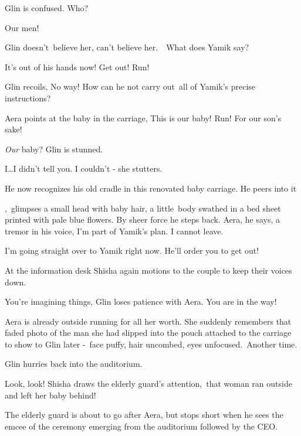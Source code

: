 \documentclass[twoside,11pt]{book}
\begin{document}
Glin is confused. {\textquotedbl}Who?{\textquotedbl}\ \ ~

{\textquotedbl}Our men!{\textquotedbl} 

Glin doesn't\ believe her, can't believe her.\ \ {\textquotedbl}What does Yamik say?{\textquotedbl} 

{\textquotedbl}It's out of his hands now! Get out! Run! {\textquotedbl} 

Glin recoils, {\textquotedbl}No way!{\textquotedbl} How can he not carry out~all of Yamik's precise instructions? 

Aera points at the baby in the carriage, {\textquotedbl}This is our baby! Run! For our son's sake!{\textquotedbl}~ 

{\textquotedbl}\textit{Our }baby?{\textquotedbl} Glin is stunned.

{\textquotedbl}I{\dots}I didn't tell you. I couldn't - {\textquotedbl}she stutters.

He now recognizes his old cradle in this renovated baby carriage. He peers into it

,{\ }glimpses a  small head with baby hair, a little{\ }body
swathed in a bed sheet printed with pale blue flowers. By sheer force he steps back.
{\textquotedbl}Aera,{\textquotedbl} he says, a tremor in his voice, {\textquotedbl}I'm part of Yamik's plan. I cannot
leave.{\textquotedbl} 

{\textquotedbl}I'm going straight over to Yamik right now. He'll order you to get out!{\textquotedbl} 

At the information desk Shisha again motions to the couple to keep their voices down.

{\textquotedbl}You're imagining things,{\textquotedbl} Glin loses patience with Aera. {\textquotedbl}You are in the
way!{\textquotedbl}

Aera is already outside running for all her worth. She suddenly remembers that faded photo of the man she had slipped
into the pouch attached to the carriage to show to Glin later -\ face puffy, hair uncombed, eyes unfocused.\ Another
time.

Glin hurries back into the auditorium. 

{\textquotedbl}Look, look!{\textquotedbl} Shisha draws the elderly guard's attention,\ {\textquotedbl}that woman ran
outside and left her baby behind!{\textquotedbl} 

The elderly guard is about to go after Aera, but stops short when he sees the emcee of the ceremony emerging from the
auditorium followed by the CEO.
\end{document}

